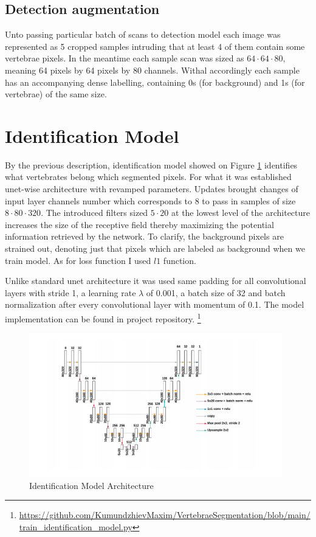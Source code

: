 \subsection{Detection augmentation}
Unto passing particular batch of scans to detection model each image was represented as 5 cropped samples intruding that at least 4 of them contain some vertebrae pixels. In the meantime each sample scan was sized as $64 \cdot 64 \cdot 80$, meaning 64 pixels by 64 pixels by 80 channels. Withal accordingly each sample has an accompanying dense labelling, containing 0s (for background) and 1s (for vertebrae) of the same size.    
 
\section{Identification Model}
By the previous description, identification model showed on Figure \ref{fig:identification_model} identifies what vertebrates belong which segmented pixels. For what it was established unet-wise architecture with revamped parameters. Updates brought changes of input layer channels number which corresponds to 8 to pass in samples of size $8 \cdot 80 \cdot 320$. The introduced filters sized $5 \cdot 20$ at the lowest level of the architecture  increases the size of the receptive field thereby maximizing the potential information retrieved by the network. To clarify, the background pixels are strained out, denoting just that pixels which are labeled as background when we train model. As for loss function I used $l1$ function.

Unlike standard unet architecture it was used same padding for all convolutional layers with stride 1, a learning rate
$\lambda$ of 0.001, a batch size of 32 and batch normalization after every convolutional layer with momentum of 0.1. The model implementation can be found in project repository. \footnote{\url{https://github.com/KumundzhievMaxim/VertebraeSegmentation/blob/main/train_identification_model.py}}

\begin{figure}[h]
    \centering \includegraphics[width=11cm]{images/identification_model.png}
    \caption {Identification Model Architecture}
    \label{fig:identification_model}
\end{figure}

